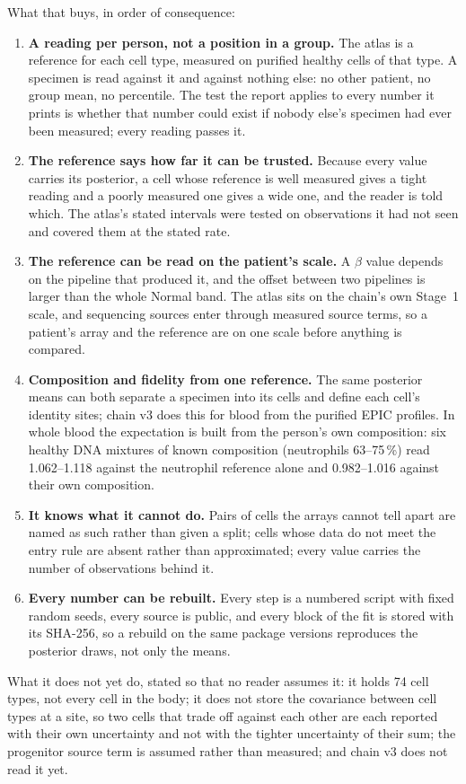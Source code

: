 What that buys, in order of consequence:
\begin{enumerate}
\item \textbf{A reading per person, not a position in a group.} The atlas is a reference for each cell type, measured on purified healthy
cells of that type. A specimen is read against it and against nothing else: no other patient, no group mean, no percentile. The test the report
applies to every number it prints is whether that number could exist if nobody else's specimen had ever been measured; every reading passes it.
\item \textbf{The reference says how far it can be trusted.} Because every value carries its posterior, a cell whose reference is well measured
gives a tight reading and a poorly measured one gives a wide one, and the reader is told which. The atlas's stated intervals were tested on
observations it had not seen and covered them at the stated rate. \measured
\item \textbf{The reference can be read on the patient's scale.} A $\beta$ value depends on the pipeline that produced it, and the offset
between two pipelines is larger than the whole Normal band. The atlas sits on the chain's own Stage~1 scale, and sequencing sources enter
through measured source terms, so a patient's array and the reference are on one scale before anything is compared. \measured
\item \textbf{Composition and fidelity from one reference.} The same posterior means can both separate a specimen into its cells and define each
cell's identity sites; chain v3 does this for blood from the purified EPIC profiles. In whole blood the expectation is built from the person's own composition: six healthy DNA mixtures of known composition (neutrophils
63--75\,\%) read 1.062--1.118 against the neutrophil reference alone and 0.982--1.016 against their own composition. \measured
\item \textbf{It knows what it cannot do.} Pairs of cells the arrays cannot tell apart are named as such rather than given a split; cells whose
data do not meet the entry rule are absent rather than approximated; every
value carries the number of observations behind it.
\item \textbf{Every number can be rebuilt.} Every step is a numbered script with fixed random seeds, every source is public, and every block
of the fit is stored with its SHA-256, so a rebuild on the same package versions reproduces the posterior draws, not only the means.
\end{enumerate}

What it does not yet do, stated so that no reader assumes it: it holds 74 cell types, not every cell in the body; it does not store the
covariance between cell types at a site, so two cells that trade off against each other are each reported with their own uncertainty and
not with the tighter uncertainty of their sum; the progenitor source term is assumed rather than measured; and chain v3 does not read it yet. \openprob
